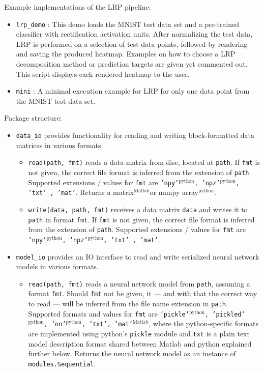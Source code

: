 \documentclass[a4wide]{article}
\newcommand{\mat}{$^\text{Matlab}$}
\newcommand{\py}{$^\text{python}$}
\begin{document}
Example implementations of the LRP pipeline:
\begin{itemize}
\item \texttt{lrp\_demo} : This demo loads the MNIST test data set and a pre-trained classifier with rectification activation units. After normalizing the test data, LRP is performed on a selection of test data points, followed by rendering and saving the produced heatmap. Examples on how to choose a LRP decomposition method or prediction targets are given yet commented out. This script displays each rendered heatmap to the user.
\item \texttt{mini} : A minimal execution example for LRP for only one data point from the MNIST test data set.
\end{itemize}

Package structure:
\begin{itemize}
\item \texttt{data\_io} provides functionality for reading and writing block-formatted data matrices in various formats. 
	\begin{itemize}
	
		\item \texttt{read(path, fmt)} reads a data matrix from disc, located at \texttt{path}. If \texttt{fmt} is not given, the correct file format is inferred from the extension of \texttt{path}. Supported extensions / values for \texttt{fmt} are \texttt{'npy'\py , 'npz'\py , 'txt' , 'mat'}. Returns a matrix\mat or numpy array\py.
		
		\item \texttt{write(data, path, fmt)} receives a data matrix \texttt{data} and writes it to \texttt{path} in format \texttt{fmt}. If \texttt{fmt} is not given, the correct file format is inferred from the extension of \texttt{path}. Supported extensions / values for \texttt{fmt} are \texttt{'npy'\py , 'npz'\py , 'txt' , 'mat'}.
		
	\end{itemize}
\item \texttt{model\_io} provides an IO interface to read and write serialized neural network models in various formats.
	\begin{itemize}
		\item \texttt{read(path, fmt)} reads a neural network model from \texttt{path}, assuming a format \texttt{fmt}. Should \texttt{fmt} not be given, it --- and with that the correct way to read --- will be inferred from the file name extension in \texttt{path}. Supported formats and values for \texttt{fmt} are \texttt{'pickle'\py , 'pickled'\py , 'nn'\py, 'txt', 'mat'\mat}, where the python-specific formats are implemented using python's \texttt{pickle} module and \texttt{txt} is a plain text model description format shared between Matlab and python explained further below. Returns the neural network model as an instance of \texttt{modules.Sequential}.



\end{itemize}
\end{itemize}
\end{document}
